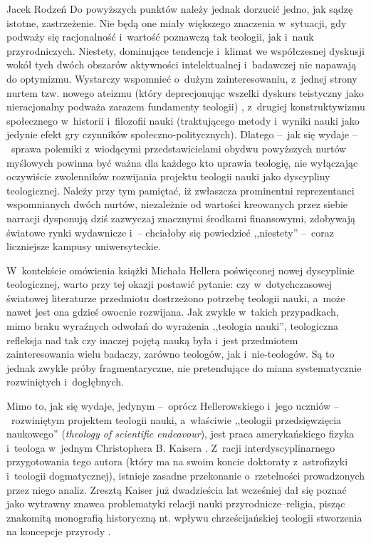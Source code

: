 \begin{newrevplenv}{Jacek Rodzeń}
Do powyższych punktów należy jednak dorzucić jedno, jak sądzę istotne, zastrzeżenie. Nie będą one miały większego znaczenia w~sytuacji, gdy podważy się racjonalność i~wartość poznawczą tak teologii, jak i~nauk przyrodniczych. Niestety, dominujące tendencje i~klimat we współczesnej dyskusji wokół tych dwóch obszarów aktywności intelektualnej i~badawczej nie napawają do optymizmu. Wystarczy wspomnieć o~dużym zainteresowaniu, z~jednej strony nurtem tzw. nowego ateizmu (który deprecjonując wszelki dyskurs teistyczny jako nieracjonalny podważa zarazem fundamenty teologii)
\parencite[zob.][]{haught_god_2008}, %
 z~drugiej konstruktywizmu społecznego w~historii i~filozofii nauki (traktującego metody i~wyniki nauki jako jedynie efekt gry czynników społeczno-politycznych). Dlatego --~jak się wydaje --~sprawa polemiki z~wiodącymi przedstawicielami obydwu powyższych nurtów myślowych powinna być ważna dla każdego kto uprawia teologię, nie wyłączając oczywiście zwolenników rozwijania projektu teologii nauki jako dyscypliny teologicznej. Należy przy tym pamiętać, iż zwłaszcza prominentni reprezentanci wspomnianych dwóch nurtów, niezależnie od wartości kreowanych przez siebie narracji dysponują dziś zazwyczaj znacznymi środkami finansowymi, zdobywają światowe rynki wydawnicze i~– chciałoby się powiedzieć ,,niestety'' --~coraz liczniejsze kampusy uniwersyteckie.

W~kontekście omówienia książki Michała Hellera poświęconej nowej dyscyplinie teologicznej, warto przy tej okazji postawić pytanie: czy w~dotychczasowej światowej literaturze przedmiotu dostrzeżono potrzebę teologii nauki, a~może nawet jest ona gdzieś owocnie rozwijana. Jak zwykle w~takich przypadkach, mimo braku wyraźnych odwołań do wyrażenia ,,teologia nauki'', teologiczna refleksja nad tak czy inaczej pojętą nauką była i~jest przedmiotem zainteresowania wielu badaczy, zarówno teologów, jak i~nie-teologów. Są to jednak zwykle próby fragmentaryczne, nie pretendujące do miana systematycznie rozwiniętych i~dogłębnych.

Mimo to, jak się wydaje, jedynym --~oprócz Hellerowskiego i~jego uczniów --~rozwiniętym projektem teologii nauki, a~właściwie ,,teologii przedsięwzięcia naukowego'' (\textit{theology of scientific endeavour}), jest praca amerykańskiego fizyka i~teologa w~jednym Christophera B. Kaisera
\parencite*[][]{kaiser_toward_2007}. %
 Z~racji interdyscyplinarnego przygotowania tego autora (który ma na swoim koncie doktoraty z~astrofizyki i~teologii dogmatycznej), istnieje zasadne przekonanie o~rzetelności prowadzonych przez niego analiz. Zresztą Kaiser już dwadzieścia lat wcześniej dał się poznać jako wytrawny znawca problematyki relacji nauki przyrodnicze–religia, pisząc znakomitą monografią historyczną nt. wpływu chrześcijańskiej teologii stworzenia na koncepcje przyrody 
\parencite[][]{kaiser_creational_1997}.%



\end{newrevplenv}

